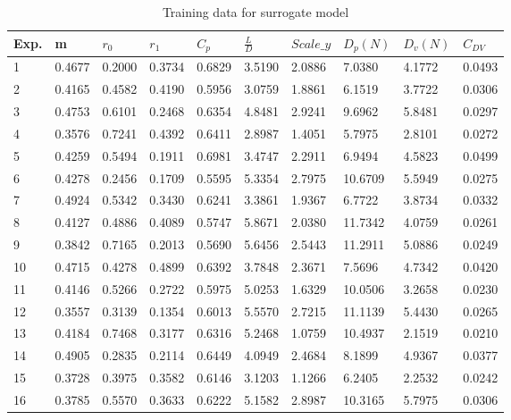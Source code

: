 \begin{longtable}{ p{}  p{}  p{}  p{}  p{} p{}  p{} p{} p{} p{}}

\caption{Training data for surrogate model}
\label{Training data for surrogate model}
\\	\hline
Exp. &	\quad m	&	$ r_{0} $	&	$ r_{1} $	&	$ C_{p} $	&	$ \frac{L}{D} $	&	$ Scale\_y $	&	$ D_{p} (N) $	&	$ D_{v} (N) $	& $ C_{DV} $	\\
\hline
1	&	0.4677	&	0.2000	&	0.3734	&	0.6829	&	3.5190	&	2.0886	&	7.0380	&	4.1772	&	0.0493	\\
2	&	0.4165	&	0.4582	&	0.4190	&	0.5956	&	3.0759	&	1.8861	&	6.1519	&	3.7722	&	0.0306	\\
3	&	0.4753	&	0.6101	&	0.2468	&	0.6354	&	4.8481	&	2.9241	&	9.6962	&	5.8481	&	0.0297	\\
4	&	0.3576	&	0.7241	&	0.4392	&	0.6411	&	2.8987	&	1.4051	&	5.7975	&	2.8101	&	0.0272	\\
5	&	0.4259	&	0.5494	&	0.1911	&	0.6981	&	3.4747	&	2.2911	&	6.9494	&	4.5823	&	0.0499	\\
6	&	0.4278	&	0.2456	&	0.1709	&	0.5595	&	5.3354	&	2.7975	&	10.6709	&	5.5949	&	0.0275	\\
7	&	0.4924	&	0.5342	&	0.3430	&	0.6241	&	3.3861	&	1.9367	&	6.7722	&	3.8734	&	0.0332	\\
8	&	0.4127	&	0.4886	&	0.4089	&	0.5747	&	5.8671	&	2.0380	&	11.7342	&	4.0759	&	0.0261	\\
9	&	0.3842	&	0.7165	&	0.2013	&	0.5690	&	5.6456	&	2.5443	&	11.2911	&	5.0886	&	0.0249	\\
10	&	0.4715	&	0.4278	&	0.4899	&	0.6392	&	3.7848	&	2.3671	&	7.5696	&	4.7342	&	0.0420	\\
11	&	0.4146	&	0.5266	&	0.2722	&	0.5975	&	5.0253	&	1.6329	&	10.0506	&	3.2658	&	0.0230	\\
12	&	0.3557	&	0.3139	&	0.1354	&	0.6013	&	5.5570	&	2.7215	&	11.1139	&	5.4430	&	0.0265	\\
13	&	0.4184	&	0.7468	&	0.3177	&	0.6316	&	5.2468	&	1.0759	&	10.4937	&	2.1519	&	0.0210	\\
14	&	0.4905	&	0.2835	&	0.2114	&	0.6449	&	4.0949	&	2.4684	&	8.1899	&	4.9367	&	0.0377	\\
15	&	0.3728	&	0.3975	&	0.3582	&	0.6146	&	3.1203	&	1.1266	&	6.2405	&	2.2532	&	0.0242	\\
16	&	0.3785	&	0.5570	&	0.3633	&	0.6222	&	5.1582	&	2.8987	&	10.3165	&	5.7975	&	0.0306	\\

\end{longtable}
